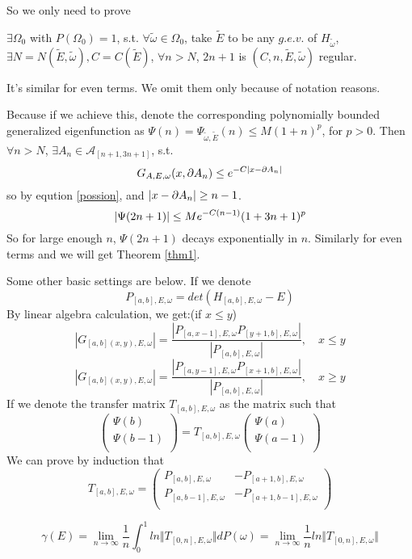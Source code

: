 So we only need to prove
\begin{thm}\label{thm2}
  $\exists \Omega_0$ with $P(\Omega_0)=1$, s.t. $\forall \tilde{\omega}\in\Omega_0$, take $\tilde{E}$ to be any $g.e.v.$ of $H_{\tilde{\omega}}$, $\exists N=N(\tilde{E},\tilde{\omega}),C=C(\tilde{E})$, $\forall n>N$, $2n+1$ is $(C,n,\tilde{E},\tilde{\omega})$ regular.
\end{thm}
\begin{remark}
  It's similar for even terms. We omit them only because of notation reasons.
\end{remark}
\begin{remark}
  Because if we achieve this, denote the corresponding polynomially bounded generalized eigenfunction as $\Psi(n)=\Psi_{\tilde{\omega},\tilde{E}}(n)\leq M(1+n)^p$, for $p>0$. Then $\forall n>N$, $\exists A_n\in\mathcal{A}_{[n+1,3n+1]}$, s.t.
  \[
  G_{A,E,\omega}(x,\partial A_n) \leq e^{-C\lvert x-\partial A_n\rvert}
  \]
  so by eqution \ref{possion}, and $\lvert x-\partial A_n\rvert\geq n-1$.
  \[
  \lvert\Psi(2n+1)\rvert\leq Me^{-C(n-1)}(1+3n+1)^p
  \]
  So for large enough $n$, $\Psi(2n+1)$ decays exponentially in $n$. Similarly for even terms and we will get Theorem \ref{thm1}.
\end{remark}

Some other basic settings are below. If we denote
\[
  P_{[a,b],E,\omega}=det(H_{[a,b],E,\omega}-E)
\]
By linear algebra calculation, we get:(if $x\leq y$)
\[
  \left\vert G_{[a,b](x,y),E,\omega}\right\vert=\frac{\left\vert P_{[a,x-1],E,\omega}P_{[y+1,b],E,\omega}\right\vert}{\left\vert P_{[a,b],E,\omega}\right\vert},\quad x\leq y
\]
\[
  \left\vert G_{[a,b](x,y),E,\omega}\right\vert=\frac{\left\vert P_{[a,y-1],E,\omega}P_{[x+1,b],E,\omega}\right\vert}{\left\vert P_{[a,b],E,\omega}\right\vert},\quad x\geq y
\]
If we denote the transfer matrix $T_{[a,b],E,\omega}$ as the matrix such that
\[
\left(
\begin{array}{c}
  \Psi(b)\\
  \Psi(b-1)\\
\end{array}
\right)
=T_{[a,b],E,\omega} \left(
\begin{array}{c}
  \Psi(a)\\
  \Psi(a-1)\\
\end{array}
\right)
\]
We can prove by induction that
\[
T_{[a,b],E,\omega}=\left(
  \begin{array}{cc}
    P_{[a,b],E,\omega} & -P_{[a+1,b],E,\omega}\\
    P_{[a,b-1],E,\omega} & -P_{[a+1,b-1],E,\omega}\\
  \end{array}
  \right)
\]
\begin{definition}
  \[
    \gamma(E)=\lim_{n\to\infty}\frac{1}{n}\int_0^1 ln\Vert T_{[0,n],E,\omega}\Vert dP(\omega)=\lim_{n\rightarrow\infty}\frac{1}{n} ln\Vert T_{[0,n],E,\omega}\Vert
  \]
\end{definition}

